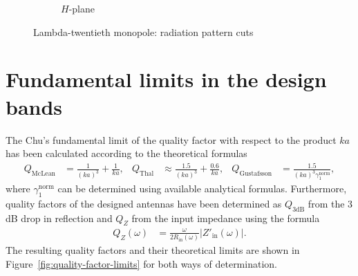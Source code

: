 \documentclass[11pt,a4paper]{article}
\begin{document}
\begin{figure}[!ht]
\begin{subfigure}{.4\textwidth}
                \caption{\label{fig:lambda-twentieth-radiation-h}$H$-plane}
            \end{subfigure}
            \caption{\label{fig:lambda-twentieth-radiation}Lambda-twentieth monopole: radiation pattern cuts}
        \end{figure}

\newpage
        \section{Fundamental limits in the design bands}
            The Chu's fundamental limit of the quality factor with respect to the product $ka$ has been calculated according to the theoretical formulas
            \begin{align}
                Q_{\mathrm{McLean}} &= \frac{1}{(ka)^3} + \frac{1}{ka},
            &
                Q_{\mathrm{Thal}} &\approx \frac{1.5}{(ka)^3} + \frac{0.6}{ka},
            &
                Q_{\mathrm{Gustafsson}} &= \frac{1.5}{(ka)^3\gamma_1^{\mathrm{norm}}},
            \end{align}
            where $\gamma_1^{\mathrm{norm}}$ can be determined using available analytical formulas. Furthermore, quality factors of the designed antennas have been determined as $Q_{3\mathrm{dB}}$ from the 3 dB drop in reflection and $Q_Z$ from the input impedance using the formula
            \begin{align}
                Q_Z(\omega) &= \frac{\omega}{2R_{\mathrm{in}}(\omega)}\left|Z'_{\mathrm{in}}(\omega)\right|.
            \end{align}
            The resulting quality factors and their theoretical limits are shown in Figure~\ref{fig:quality-factor-limits} for both ways of determination.
\end{document}
